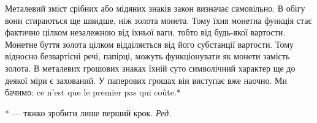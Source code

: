 Металевий зміст срібних або мідяних знаків закон визначає
самовільно. В обігу вони стираються ще швидше, ніж золота
монета. Тому їхня монетна функція стає фактично цілком незалежною
від їхньої ваги, тобто від будь-якої вартости. Монетне
буття золота цілком відділяється від його субстанції вартости.
Тому відносно безвартісні речі, папірці, можуть функціонувати
як монети замість золота. В металевих грошових знаках їхній
суто символічний характер ще до деякої міри є захований. У паперових
грошах він виступає вже наочно. Ми бачимо: ce n’est que
le premier pas qui coûte.*

* — тяжко зробити лише перший крок. \emph{Ред.}
